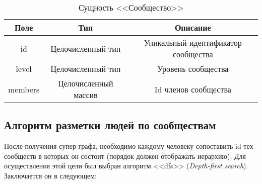 \begin{table}[H]
	\begin{center}
		\begin{threeparttable}
			\caption{Сущность <<Сообщество>>}
			\label{tbl:com}
			\begin{tabular}{|c|c|c|}
			\hline
			\textbf{Поле} & \textbf{Тип} & \textbf{Описание} \\
			\hline
			id & Целочисленный тип & Уникальный идентификатор сообщества \\
			\hline
			level & Целочисленный тип & Уровень сообщества \\
			\hline
			members & Целочисленный массив & Id членов сообщества \\
			\hline
			\end{tabular}
		\end{threeparttable}
	\end{center}
\end{table}

\subsection{Алгоритм разметки людей по сообществам}

После получения супер графа, необходимо каждому человеку сопоставить id тех сообществ в которых он состоит (порядок должен отображать иерархию). Для осуществления этой цели был выбран алгоритм <<dfs>> (\textit{Depth-first search}). Заключается он в следующем:


